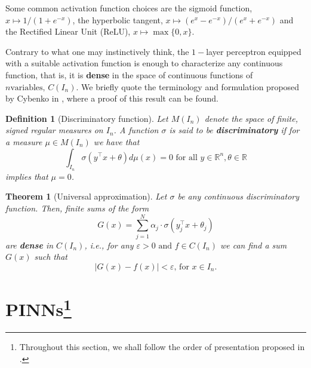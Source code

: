 \documentclass[12pt]{report} %
\newtheorem{definition}{Definition}
\newtheorem{theorem}{Theorem}
\newcommand{\tmstrong}[1]{\textbf{#1}}
\begin{document}
Some common activation function choices are the sigmoid function, $x \mapsto 1/(1 + e^{- x})$, the hyperbolic tangent, $x \mapsto (e^x - e^{- x})/(e^x + e^{- x})$ and the Rectified Linear Unit (ReLU), $x \mapsto \max \{ 0, x \}$. 

Contrary to what one may instinctively think, the $1 -$layer perceptron equipped with a suitable activation function is
enough to characterize any continuous function, that is, it is
{\tmstrong{dense}} in the space of continuous functions of $n \text{
variables, } C (I_n)$. We briefly quote the terminology and formulation
proposed by Cybenko in \cite{cybenko1989approximation}, where a proof of this result can be found.

\begin{definition}[Discriminatory function]
  Let $M (I_n)$ denote the space of finite, signed regular measures on \(I_n\).
  A function \(\sigma\) is said to be {\tmstrong{discriminatory}} if for a
  measure \(\mu \in M (I_n)\) we have that
  \[ \int_{I_n} \sigma (y^{\top} x + \theta) d \mu (x) = 0 \text{ for all } y
     \in \mathbb{R}^n, \theta \in \mathbb{R} \]
  implies that \(\mu = 0\).
\end{definition}

\begin{theorem}[Universal approximation]
  Let \(\sigma\) be any continuous discriminatory function. Then, finite sums of
  the form
  \[ G (x) = \sum_{j = 1}^N \alpha_j \cdot \sigma (y_j^{\top} x + \theta_j) \]
  are \textbf{dense} in \(C (I_n)\), i.e., for any $\varepsilon > 0 \text{ and } f \in C
  (I_n)$ we can find a sum \(G (x)\) such that
  \[ | G (x) - f (x) | < \varepsilon \text{, for } x \in I_n . \]
\end{theorem}



\section[PINNs]{PINNs\footnote{Throughout this section, we shall follow the order of presentation proposed in \cite{cuomo2022scientific}.}}
\end{document}

